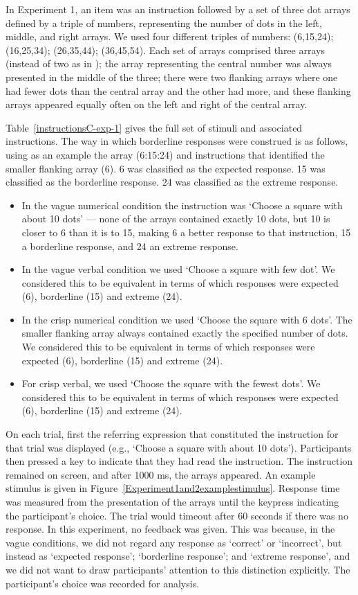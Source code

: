 \documentclass[ %
  graybox       %
 ,envcountchap  %
 ,sectrefs      %
]{svmono}
\begin{document}
In Experiment 1, an item was an instruction followed by a set of three dot arrays defined by a triple of numbers, representing the number of dots in the left, middle, and right arrays. We used four different triples of numbers: (6,15,24); (16,25,34); (26,35,44); (36,45,54). Each set of arrays comprised three arrays (instead of two as in \citet{green2013utility}); the array representing the central number was always presented in the middle of the three; there were two flanking arrays where one had fewer dots than the central array and the other had more, and these flanking arrays appeared equally often on the left and right of the central array.

Table~\ref{instructionsC-exp-1} gives the full set of stimuli and associated instructions. The way in which borderline responses were construed is as follows, using as an example the array (6:15:24) and instructions that identified the smaller flanking array (6). 6 was classified as the expected response. 15 was classified as the borderline response. 24 was classified as the extreme response.

\begin{itemize}
	\item In the vague numerical condition the instruction was `Choose a square with about 10 dots' --- none of the arrays contained exactly 10 dots, but 10 is closer to 6 than it is to 15, making 6 a better response to that instruction, 15 a borderline response, and 24 an extreme response.
	\item In the vague verbal condition we used `Choose a square with few dot'. We considered this to be equivalent in terms of which responses were expected (6), borderline (15) and extreme (24).
	\item In the crisp numerical condition we used `Choose the square with 6 dots'. The smaller flanking array always contained exactly the specified number of dots. We considered this to be equivalent in terms of which responses were expected (6), borderline (15) and extreme (24).
	\item For crisp verbal, we used `Choose the square with the fewest dots'. We considered this to be equivalent in terms of which responses were expected (6), borderline (15) and extreme (24).
\end{itemize}

On each trial, first the referring expression that constituted the instruction for that trial was displayed (e.g., `Choose a square with about 10 dots'). Participants then pressed a key to indicate that they had read the instruction. The instruction remained on screen, and after 1000 ms, the arrays appeared. An example stimulus is given in Figure~\ref{Experiment1and2examplestimulus}. Response time was measured from the presentation of the arrays until the keypress indicating the participant's choice. The trial would timeout after 60 seconds if there was no response. In this experiment, no feedback was given. This was because, in the vague conditions, we did not regard any response as `correct' or `incorrect', but instead as `expected response'; `borderline response'; and `extreme response', and we did not want to draw participants' attention to this distinction explicitly. The participant's choice was recorded for analysis.
\end{document}
